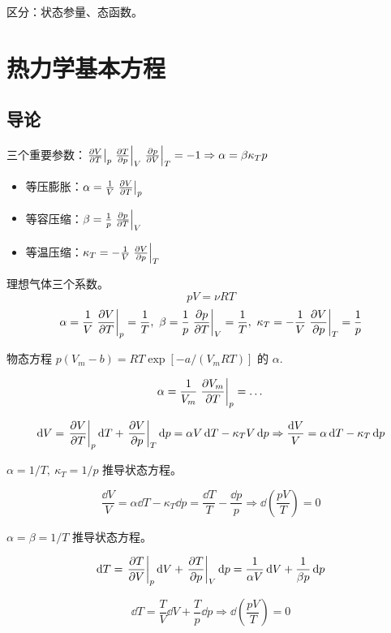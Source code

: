 区分：状态参量、态函数。

\section{热力学基本方程}

\subsection{导论}

三个重要参数：$\left.\pdv{V}{T}\right|_p \left.\pdv{T}{p}\right|_V \left.\pdv{p}{V}\right|_T = - 1 \Rightarrow \alpha = \beta \kappa_T p$

\begin{itemize}
    \item 等压膨胀：$\alpha = \frac{1}{V} \left.\pdv{V}{T}\right|_p$
    \item 等容压缩：$\beta = \frac{1}{p} \left.\pdv{p}{T}\right|_V$
    \item 等温压缩：$\kappa_T = - \frac{1}{V} \left.\pdv{V}{p}\right|_T$
\end{itemize}

\begin{framed}
理想气体三个系数。
\[
p V = \nu R T
\]
\[
\alpha = \frac{1}{V} \left.\pdv{V}{T}\right|_p = \frac{1}{T},\ \beta = \frac{1}{p} \left.\pdv{p}{T}\right|_V = \frac{1}{T},\ \kappa_T = - \frac{1}{V} \left.\pdv{V}{p}\right|_T = \frac{1}{p}
\]
\end{framed}

\begin{framed}
物态方程 $p (V_m - b) = R T \exp [-a / (V_m R T)]$ 的 $\alpha$.

\[
\alpha = \frac{1}{V_m} \left.\pdv{V_m}{T}\right|_p = \dots
\]
\end{framed}

\[
\dd V = \left.\pdv{V}{T}\right|_p \dd{T} + \left.\pdv{V}{p}\right|_T \dd{p} = \alpha V \dd{T} - \kappa_T V \dd{p} \Rightarrow \frac{\dd{V}}{V} = \alpha \dd{T} - \kappa_T \dd{p}
\]

\begin{framed}
$\alpha = 1 / T,\ \kappa_T = 1 / p$ 推导状态方程。

\[
\frac{\dd{V}}{V} = \alpha \dd{T} - \kappa_T \dd{p} = \frac{\dd{T}}{T} - \frac{\dd{p}}{p} \Rightarrow \dd{(\frac{p V}{T})} = 0
\]
\end{framed}

\begin{framed}
$\alpha = \beta = 1 / T$ 推导状态方程。

\[
\dd T = \left.\pdv{T}{V}\right|_p \dd{V} + \left.\pdv{T}{p}\right|_V \dd{p} = \frac{1}{\alpha V} \dd{V} + \frac{1}{\beta p} \dd{p}
\]

\[
\dd T = \frac{T}{V} \dd{V} + \frac{T}{p} \dd{p} \Rightarrow \dd{(\frac{p V}{T})} = 0
\]
\end{framed}

